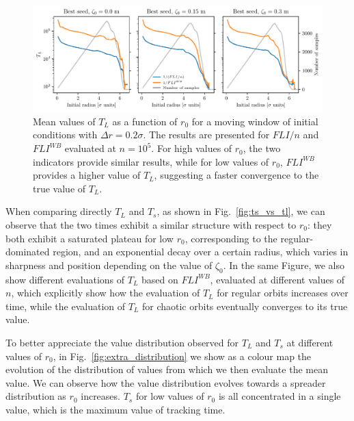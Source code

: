 \begin{figure}
    \centering
    \includegraphics[width=1\textwidth]{6_lhc_dynamic_indicators/figs/lyapunov_time_vs_lyapunov_wb_time.pdf}
    \caption{Mean values of $T_L$ as a function of $r_0$ for a moving window of initial conditions with $\Delta r = 0.2\sigma$. The results are presented for $FLI/n$ and $FLI^{{WB}}$ evaluated at $n=10^5$. For high values of $r_0$, the two indicators provide similar results, while for low values of $r_0$, $FLI^{{WB}}$ provides a higher value of $T_L$, suggesting a faster convergence to the true value of $T_L$.}
    \label{fig:lyapunov_time_fli_vs_wb}
\end{figure}

When comparing directly $T_L$ and $T_s$, as shown in Fig.~\ref{fig:ts_vs_tl}, we can observe that the two times exhibit a similar structure with respect to $r_0$: they both exhibit a saturated plateau for low $r_0$, corresponding to the regular-dominated region, and an exponential decay over a certain radius, which varies in sharpness and position depending on the value of $\zeta_0$. In the same Figure, we also show different evaluations of $T_L$ based on $FLI^{WB}$, evaluated at different values of $n$, which explicitly show how the evaluation of $T_L$ for regular orbits increases over time, while the evaluation of $T_L$ for chaotic orbits eventually converges to its true value.

To better appreciate the value distribution observed for $T_L$ and $T_s$ at different values of $r_0$, in Fig.~\ref{fig:extra_distribution} we show as a colour map the evolution of the distribution of values from which we then evaluate the mean value. We can observe how the value distribution evolves towards a spreader distribution as $r_0$ increases. $T_s$ for low values of $r_0$ is all concentrated in a single value, which is the maximum value of tracking time.   

